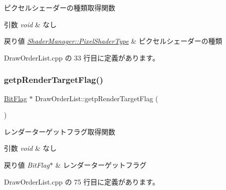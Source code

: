 ピクセルシェーダーの種類取得関数 


\begin{DoxyParams}{引数}
{\em void} & なし \\
\hline
\end{DoxyParams}

\begin{DoxyRetVals}{戻り値}
{\em \mbox{\hyperlink{class_shader_manager_a7d15d773b3c6a99dd7086c45c8b0be5f}{Shader\+Manager\+::\+Pixel\+Shader\+Type}}} & ピクセルシェーダーの種類 \\
\hline
\end{DoxyRetVals}


 Draw\+Order\+List.\+cpp の 33 行目に定義があります。

\mbox{\label{class_draw_order_list_a3c483376f2da73a403bbd82f7e9e3370}} 
\subsubsection{\texorpdfstring{getp\+Render\+Target\+Flag()}{getpRenderTargetFlag()}}
{\footnotesize\ttfamily \mbox{\hyperlink{class_bit_flag}{Bit\+Flag}} $\ast$ Draw\+Order\+List\+::getp\+Render\+Target\+Flag (\begin{DoxyParamCaption}{ }\end{DoxyParamCaption})}



レンダーターゲットフラグ取得関数 


\begin{DoxyParams}{引数}
{\em void} & なし \\
\hline
\end{DoxyParams}

\begin{DoxyRetVals}{戻り値}
{\em Bit\+Flag$\ast$} & レンダーターゲットフラグ \\
\hline
\end{DoxyRetVals}


 Draw\+Order\+List.\+cpp の 75 行目に定義があります。

\mbox{\label{class_draw_order_list_a8ab03bec2bf394ed6ffc3d44b0eaabb4}} 
